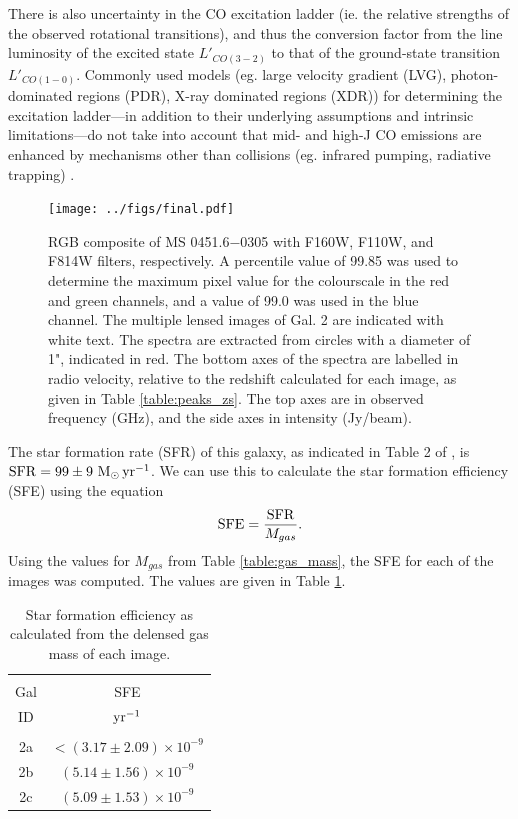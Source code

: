 \documentclass[11pt]{article}
\begin{document}
There is also uncertainty in the CO excitation ladder (ie. the relative strengths of the observed rotational transitions), and thus the conversion factor from the line luminosity of the excited state $L'_{CO(3-2)}$ to that of the ground-state transition $L'_{CO(1-0)}$. Commonly used models (eg. large velocity gradient (LVG), photon-dominated regions (PDR), X-ray dominated regions (XDR)) for determining the excitation ladder---in addition to their underlying assumptions and intrinsic limitations---do not take into account that mid- and high-J CO emissions are enhanced by mechanisms other than collisions (eg. infrared pumping, radiative trapping) \citep{Carilli2013}. 

\begin{figure}[!htbp]
    \hspace{-1cm}
    \texttt{[image: ../figs/final.pdf]}
	\caption{RGB composite of MS 0451.6−0305 with F160W, F110W, and F814W filters, respectively. A percentile value of 99.85 was used to determine the maximum pixel value for the colourscale in the red and green channels, and a value of 99.0 was used in the blue channel. The multiple lensed images of Gal. 2 are indicated with white text. The spectra are extracted from circles with a diameter of 1", indicated in red. The bottom axes of the spectra are labelled in radio velocity, relative to the redshift calculated for each image, as given in Table \ref{table:peaks_zs}. The top axes are in observed frequency (GHz), and the side axes in intensity (Jy/beam).}
    \label{fig:final_oteo}
\end{figure}

The star formation rate (SFR) of this galaxy, as indicated in Table 2 of \cite{MacKenzie2014}, is ${\rm SFR}=99\pm9~{\rm M_\odot\,yr^{-1}}$. We can use this to calculate the star formation efficiency (SFE) using the equation
\begin{align}
	{\rm SFE} = \frac{\rm SFR}{M_{gas}}.
\end{align}
Using the values for $M_{gas}$ from Table \ref{table:gas_mass}, the SFE for each of the images was computed. The values are given in Table \ref{table:sfe}.

\begin{table}[!htbp]
\centering
\begin{tabular}{cc}
\hline \\[-0.25cm]
Gal & SFE \\
ID  & $\rm{yr^{-1}}$ \\[0.1cm]
\hline \\[-0.25cm]
2a & $<(3.17 \pm 2.09)\times 10^{-9}$ \\
2b & $(5.14 \pm 1.56)\times 10^{-9}$  \\
2c & $(5.09 \pm 1.53)\times 10^{-9}$  \\
\hline
\end{tabular}
\caption{Star formation efficiency as calculated from the delensed gas mass of each image.}
\label{table:sfe}
\end{table}

\newpage
\nocite{*}

\end{document}
